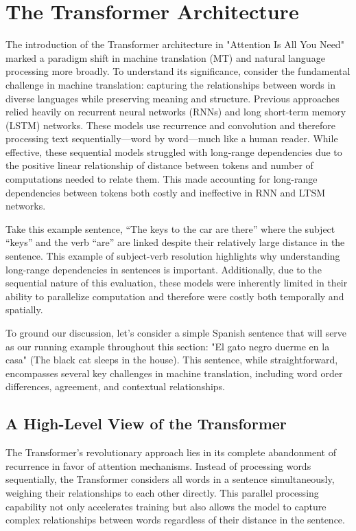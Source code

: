\section{The Transformer Architecture}
The introduction of the Transformer architecture in "Attention Is All You Need" \cite{NIPS2017_3f5ee243} marked a paradigm shift in machine translation (MT) and natural language processing more broadly. To understand its significance, consider the fundamental challenge in machine translation: capturing the relationships between words in diverse languages while preserving meaning and structure. Previous approaches relied heavily on recurrent neural networks (RNNs) and long short-term memory (LSTM) networks. These models use recurrence and convolution and therefore processing text sequentially—word by word—much like a human reader. While effective, these sequential models struggled with long-range dependencies due to the positive linear relationship of distance between tokens and number of computations needed to relate them. This made accounting for long-range dependencies between tokens both costly and ineffective in RNN and LTSM networks. 

Take this example sentence, “The keys to the car are there” where the subject “keys” and the verb “are” are linked despite their relatively large distance in the sentence. This example of subject-verb resolution highlights why understanding long-range dependencies in sentences is important.  Additionally, due to the sequential nature of this evaluation, these models were inherently limited in their ability to parallelize computation and therefore were costly both temporally and spatially. 

To ground our discussion, let's consider a simple Spanish sentence that will serve as our running example throughout this section: "El gato negro duerme en la casa" (The black cat sleeps in the house). This sentence, while straightforward, encompasses several key challenges in machine translation, including word order differences, agreement, and contextual relationships.

\subsection{A High-Level View of the Transformer}

The Transformer's revolutionary approach lies in its complete abandonment of recurrence in favor of attention mechanisms. Instead of processing words sequentially, the Transformer considers all words in a sentence simultaneously, weighing their relationships to each other directly. This parallel processing capability not only accelerates training but also allows the model to capture complex relationships between words regardless of their distance in the sentence.

